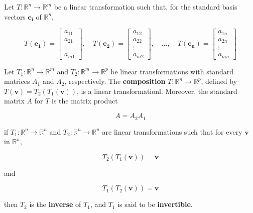 \documentclass{report}
\begin{document}
\begin{tcolorbox}[title = Standard Matrix for a Linear Transformation]
	Let $T: \mathbb{R}^n \to \mathbb{R}^m$ be a linear transformation such that, for the standard basis vectors $\bm{e_i}$ of $\mathbb{R}^n$,
	
	$$
	T(\bm{e_1}) = \begin{bmatrix} a_{11} \\ a_{21} \\  \vdots \\ a_{m1} \end{bmatrix}, \quad T(\bm{e_2}) = \begin{bmatrix} a_{12} \\ a_{22} \\ \vdots \\ a_{m2} \end{bmatrix}, \quad \hdots, \quad T(\bm{e_n}) = \begin{bmatrix} a_{1n} \\ a_{2n} \\ \vdots \\ a_{mn} \end{bmatrix}
	$$
	
\end{tcolorbox}

\begin{tcolorbox}[title = Composition of Linear Transformations]
	Let $T_1: \mathbb{R}^n \to \mathbb{R}^m$ and $T_2: \mathbb{R}^m \to \mathbb{R}^p$ be linear transformations with standard matrices $A_1$ and $A_2$, respectively. The \textbf{composition} $T: \mathbb{R}^n \to \mathbb{R}^p$, defined by $T(\bm{v}) = T_2 (T_1 (\bm{v}))$, is a linear transformationl. Moreover, the standard matrix $A$ for $T$ is the matrix product 
	
	$$
	A = A_2 A_1 
	$$
\end{tcolorbox}

\begin{tcolorbox}[title = Definition of Inverse Linear Transformation]
	if $T_1: \mathbb{R}^n \to \mathbb{R}^n$ and $T_2: \mathbb{R}^n \to \mathbb{R}^n$ are linear transformations such that for every $\bm{v}$ in $\mathbb{R}^n$,
	
	$$
	T_2 (T_1 (\bm{v})) = \bm{v}
	$$
	
	and
	
	$$
	T_1 (T_2 (\bm{v})) = \bm{v}
	$$
	
	then $T_2$ is the \textbf{inverse} of $T_1$, and $T_1$ is said to be \textbf{invertible}.
\end{tcolorbox}
\end{document}

